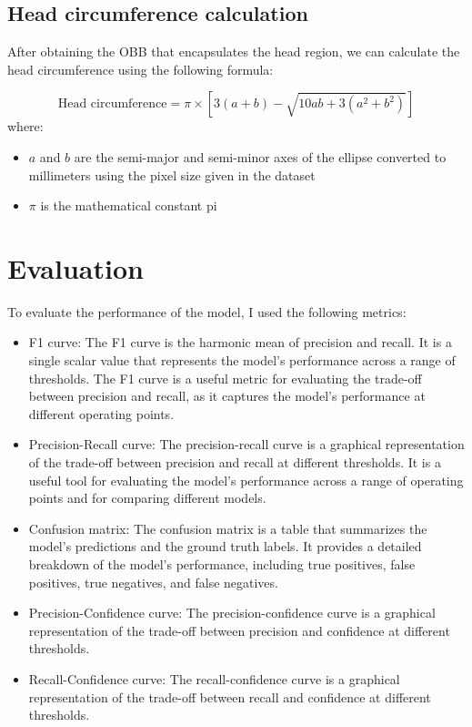\documentclass[14pt]{extreport}
\begin{document}
\section{Head circumference calculation}

After obtaining the OBB that encapsulates the head region, we can calculate the head circumference using the following formula:

\begin{equation*}
    \text{Head circumference} = \pi \times \left[3(a+b)-\sqrt{10ab+3\left(a^2+b^2\right)}\right]
\end{equation*}
where:
\begin{itemize}
    \item $a$ and $b$ are the semi-major and semi-minor axes of the ellipse converted to millimeters using the pixel size given in the dataset
    \item $\pi$ is the mathematical constant pi
\end{itemize}
\chapter{Evaluation}
To evaluate the performance of the model, I used the following metrics:
\begin{itemize}
    \item F1 curve: The F1 curve is the harmonic mean of precision and recall. It is a single scalar value that represents the model's performance across a range of thresholds. The F1 curve is a useful metric for evaluating the trade-off between precision and recall, as it captures the model's performance at different operating points.
    \item Precision-Recall curve: The precision-recall curve is a graphical representation of the trade-off between precision and recall at different thresholds. It is a useful tool for evaluating the model's performance across a range of operating points and for comparing different models.
    \item Confusion matrix: The confusion matrix is a table that summarizes the model's predictions and the ground truth labels. It provides a detailed breakdown of the model's performance, including true positives, false positives, true negatives, and false negatives.
    \item Precision-Confidence curve: The precision-confidence curve is a graphical representation of the trade-off between precision and confidence at different thresholds.
    \item Recall-Confidence curve: The recall-confidence curve is a graphical representation of the trade-off between recall and confidence at different thresholds.
\end{itemize}
\end{document}
